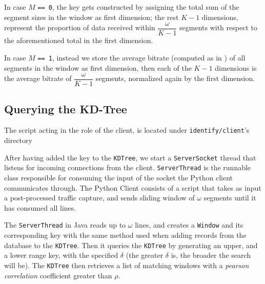In case $M$ \texttt{== 0}, the key gets constructed by assigning the
total sum of the segment sizes in the window as first dimension; the
rest $K - 1$ dimensions, represent the proportion of data received
within $\dfrac{\omega}{K-1}$ segments with respect to the
aforementioned total in the first dimension.

In case $M$ \texttt{== 1}, instead we store the average bitrate
(computed as in ) of all segments in the window as
first dimension, then each of the $K-1$ dimensions is the average
bitrate of $\dfrac{\omega}{K-1}$ segments, normalized again by the
first dimension.

\subsection{Querying the KD-Tree}

The script acting in the role of the client, is located under
\texttt{identify/client}'s directory
\begin{small}
\end{small}

After having added the key to the \texttt{KDTree}, we start a
\texttt{ServerSocket} thread that listens for incoming connections from the
client. \texttt{ServerThread} is the runnable class responsible for consuming
the input of the socket the Python client communicates through.  The Python
Client consists of a script that takes as input a post-processed traffic
capture, and sends sliding window of $\omega$ segments until it has consumed
all lines.

The \texttt{ServerThread} in Java reads up to $\omega$ lines, and creates a
\texttt{Window} and its corresponding key with the same method used when adding
records from the database to the \texttt{KDTree}. Then it queries the
\texttt{KDTree} by generating an upper, and a lower range key, with the
specified $\delta$ (the greater $\delta$ is, the broader the search will be).
The \texttt{KDTree} then retrieves a list of matching windows with a
\emph{pearson correlation} coefficient greater than $\rho$.
